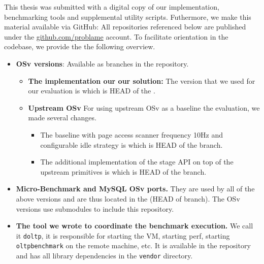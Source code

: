 \documentclass[12pt,a4paper]{book}
\begin{document}
This thesis was submitted with a digital copy of our implementation, benchmarking tools and supplemental utility scripts.
Futhermore, we make this material available via GitHub:
All repositories referenced below are published under the \url{github.com/problame} account.
To facilitate orientation in the codebase, we provide the the following overview.

\begin{itemize}
    \item \textbf{OSv versions}:
        Available as branches in the  repository.
    \begin{itemize}
        \item \textbf{The implementation our our solution:}
            The version that we used for our evaluation is  which is HEAD of the .
        \item \textbf{Upstream OSv}
            For using upstream OSv as a baseline the evaluation, we made several changes.
            \begin{itemize}
                \item The baseline with page access scanner frequency 10Hz and configurable idle strategy is  which is HEAD of the  branch.

                \item The additional implementation of the stage API on top of the upstream primitives is  which is HEAD of the  branch.
            \end{itemize}
    \end{itemize}

    \item \textbf{Micro-Benchmark and MySQL OSv ports.}
        They are used by all of the above versions and are thus located in the  (HEAD of  branch).
        The OSv versions use submodules to include this repository.

    \item \textbf{The tool we wrote to coordinate the benchmark execution.}
        We call it \texttt{doltp}, it is responsible for starting the VM, starting perf, starting \texttt{oltpbenchmark} on the remote machine, etc.
        It is available in the  repository and has all library dependencies in the \texttt{vendor} directory.


\end{itemize}
\end{document}
